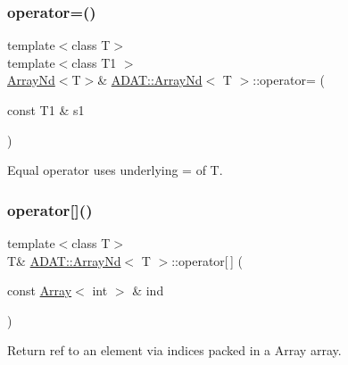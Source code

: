 \subsubsection{\texorpdfstring{operator=()}{operator=()}\hspace{0.1cm}{\footnotesize\ttfamily [15/15]}}
{\footnotesize\ttfamily template$<$class T$>$ \\
template$<$class T1 $>$ \\
\mbox{\hyperlink{classADAT_1_1ArrayNd}{Array\+Nd}}$<$T$>$\& \mbox{\hyperlink{classADAT_1_1ArrayNd}{A\+D\+A\+T\+::\+Array\+Nd}}$<$ T $>$\+::operator= (\begin{DoxyParamCaption}\item[{const T1 \&}]{s1 }\end{DoxyParamCaption})\hspace{0.3cm}{\ttfamily [inline]}}



Equal operator uses underlying = of T. 

\mbox{\label{classADAT_1_1ArrayNd_a5689e9a64be5914877dc3882cc68a283}} 
\subsubsection{\texorpdfstring{operator[]()}{operator[]()}\hspace{0.1cm}{\footnotesize\ttfamily [1/6]}}
{\footnotesize\ttfamily template$<$class T$>$ \\
T\& \mbox{\hyperlink{classADAT_1_1ArrayNd}{A\+D\+A\+T\+::\+Array\+Nd}}$<$ T $>$\+::operator\mbox{[}$\,$\mbox{]} (\begin{DoxyParamCaption}\item[{const \mbox{\hyperlink{classXMLArray_1_1Array}{Array}}$<$ int $>$ \&}]{ind }\end{DoxyParamCaption})\hspace{0.3cm}{\ttfamily [inline]}}



Return ref to an element via indices packed in a Array array. 

\mbox{\label{classADAT_1_1ArrayNd_a5689e9a64be5914877dc3882cc68a283}} 
